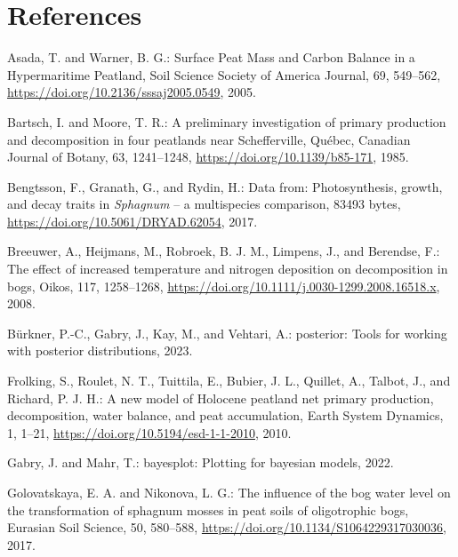 \documentclass[
  12pt,
]{article}
\newlength{\cslhangindent}
\newlength{\cslentryspacingunit} %
\newenvironment{CSLReferences}[2] %
 {%
  \setlength{\parindent}{0pt}
  \ifodd #1
  \let\oldpar\par
  \def\par{\hangindent=\cslhangindent\oldpar}
  \fi
  \setlength{\parskip}{#2\cslentryspacingunit}
 }%
 {}
\begin{document}
\hypertarget{references}{%
\section*{References}\label{references}}

\hypertarget{refs}{}
\begin{CSLReferences}{0}{0}
\leavevmode{}%
Asada, T. and Warner, B. G.: Surface {Peat Mass} and {Carbon Balance} in a {Hypermaritime Peatland}, Soil Science Society of America Journal, 69, 549--562, \url{https://doi.org/10.2136/sssaj2005.0549}, 2005.

\leavevmode{}%
Bartsch, I. and Moore, T. R.: A preliminary investigation of primary production and decomposition in four peatlands near {Schefferville}, {Qu{é}bec}, Canadian Journal of Botany, 63, 1241--1248, \url{https://doi.org/10.1139/b85-171}, 1985.

\leavevmode{}%
Bengtsson, F., Granath, G., and Rydin, H.: Data from: {Photosynthesis}, growth, and decay traits in {\emph{Sphagnum}} -- a multispecies comparison, 83493 bytes, \url{https://doi.org/10.5061/DRYAD.62054}, 2017.

\leavevmode{}%
Breeuwer, A., Heijmans, M., Robroek, B. J. M., Limpens, J., and Berendse, F.: The effect of increased temperature and nitrogen deposition on decomposition in bogs, Oikos, 117, 1258--1268, \url{https://doi.org/10.1111/j.0030-1299.2008.16518.x}, 2008.

\leavevmode{}%
Bürkner, P.-C., Gabry, J., Kay, M., and Vehtari, A.: {posterior}: {Tools} for working with posterior distributions, 2023.

\leavevmode{}%
Frolking, S., Roulet, N. T., Tuittila, E., Bubier, J. L., Quillet, A., Talbot, J., and Richard, P. J. H.: A new model of {Holocene} peatland net primary production, decomposition, water balance, and peat accumulation, Earth System Dynamics, 1, 1--21, \url{https://doi.org/10.5194/esd-1-1-2010}, 2010.

\leavevmode{}%
Gabry, J. and Mahr, T.: {bayesplot}: {Plotting} for bayesian models, 2022.

\leavevmode{}%
Golovatskaya, E. A. and Nikonova, L. G.: The influence of the bog water level on the transformation of sphagnum mosses in peat soils of oligotrophic bogs, Eurasian Soil Science, 50, 580--588, \url{https://doi.org/10.1134/S1064229317030036}, 2017.


\end{CSLReferences}
\end{document}
